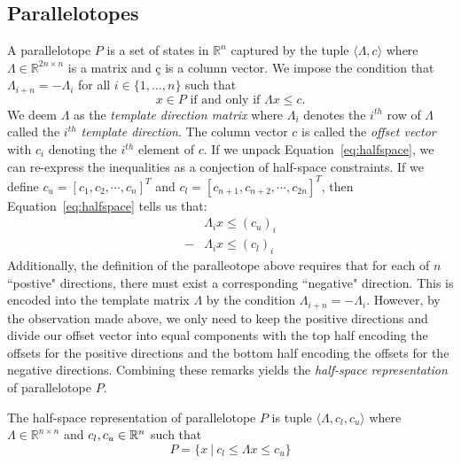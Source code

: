 \subsection{Parallelotopes}
\label{sec:parallelotope}
A parallelotope $P$ is a set of states in $\mathbb{R}^{n}$ captured by the tuple $\langle \Lambda, c\rangle$ where $\Lambda \in \mathbb{R}^{2n \times n}$ is a matrix and $ç$ is a column vector. We impose the condition that $\Lambda_{i+n} = -\Lambda_{i}$ for all $i \in \{1, \ldots, n\}$ such that
%
\begin{equation}
\label{eq:halfspace}
x \in P \mbox{ if and only if } \Lambda x \leq c.
\end{equation}
We deem $\Lambda$ as the \emph{template direction matrix} where $\Lambda_i$ denotes the $i^{th}$ row of $\Lambda$ called the \emph{$i^{th}$ template direction}. The column vector $c$ is called the \emph{offset vector} with $c_i$ denoting the $i^{th}$ element of $c$.
%
If we unpack Equation~\ref{eq:halfspace}, we can re-express the inequalities as a conjection of half-space constraints. If we define $c_{u} = [c_1, c_2, \cdots, c_n]^T$ and $c_{l} = [c_{n+1}, c_{n+2}, \cdots, c_{2n}]^T$, then Equation~\ref{eq:halfspace} tells us that:
%
\begin{align*}
  & \Lambda_i x \leq (c_u)_i \\
  -& \Lambda_i x \leq (c_l)_i
\end{align*}
%
Additionally, the definition of the paralleotope above requires that for each of $n$ ``postive" directions, there must exist a corresponding ``negative" direction. This is encoded into the template matrix $\Lambda$ by the condition $\Lambda_{i+n} = -\Lambda_{i}$. However, by the observation made above, we only need to keep the positive directions and divide our offset vector into equal components with the top half encoding the offsets for the positive directions and the bottom half encoding the offsets for the negative directions.
%
Combining these remarks yields the \emph{half-space representation} of parallelotope $P$.
%
\begin{definition}
\label{def:halfspace_def}
The half-space representation of parallelotope $P$ is tuple  $\langle \Lambda, c_l, c_u \rangle$ where $\Lambda \in \mathbb{R}^{n \times n}$ and $c_l, c_u \in {\mathbb{R}}^n$
such that
\begin{equation}
\label{eq:halfspaceconst}
P =\{x ~|~ c_l \leq \Lambda x \leq c_u\}
\end{equation}
\end{definition}


